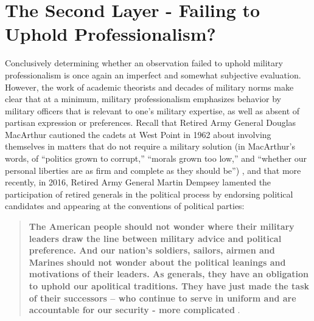 \documentclass[12pt,]{article}
\begin{document}
\singlespace

\hypertarget{the-second-layer---failing-to-uphold-professionalism}{%
\section{The Second Layer - Failing to Uphold Professionalism?}\label{the-second-layer---failing-to-uphold-professionalism}}

\doublespace

Conclusively determining whether an observation failed to uphold military professionalism is once again an imperfect and somewhat subjective evaluation. However, the work of academic theorists and decades of military norms make clear that at a minimum, military professionalism emphasizes behavior by military officers that is relevant to one's military expertise, as well as absent of partisan expression or preferences. Recall that Retired Army General Douglas MacArthur cautioned the cadets at West Point in 1962 about involving themselves in matters that do not require a military solution (in MacArthur's words, of ``politics grown to corrupt,'' ``morals grown too low,'' and ``whether our personal liberties are as firm and complete as they should be'') \autocite{macarthur_duty_1962}, and that more recently, in 2016, Retired Army General Martin Dempsey lamented the participation of retired generals in the political process by endorsing political candidates and appearing at the conventions of political parties:

\singlespace

\begin{quote}
\textbf{The American people should not wonder where their military leaders draw the line between military advice and political preference. And our nation's soldiers, sailors, airmen and Marines should not wonder about the political leanings and motivations of their leaders. As generals, they have an obligation to uphold our apolitical traditions. They have just made the task of their successors -- who continue to serve in uniform and are accountable for our security - more complicated} \autocite{dempsey_military_2016}.
\end{quote}

\doublespace
\end{document}
